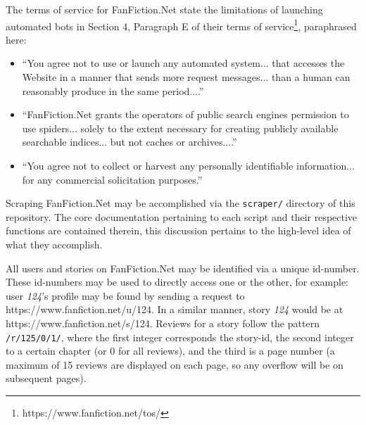 \documentclass[letterpaper]{article}
\begin{document}
The terms of service for FanFiction.Net state the limitations of launching automated bots in Section 4, Paragraph E of their terms of service\footnote{https://www.fanfiction.net/tos/}, paraphrased here:

\begin{itemize}
    \item ``You agree not to use or launch any automated system... that accesses the Website in a manner that sends more request messages... than a human can reasonably produce in the same period....''
    \item ``FanFiction.Net grants the operators of public search engines permission to use spiders... solely to the extent necessary for creating publicly available searchable indices... but not caches or archives....''
    \item ``You agree not to collect or harvest any personally identifiable information... for any commercial solicitation purposes.''
\end{itemize}

Scraping FanFiction.Net may be accomplished via the \texttt{scraper/} directory of this repository. The core documentation pertaining to each script and their respective functions are contained therein, this discussion pertains to the high-level idea of what they accomplish.

All users and stories on FanFiction.Net may be identified via a unique id-number. These id-numbers may be used to directly access one or the other, for example: user \textit{124}'s profile may be found by sending a request to https://www.fanfiction.net/u/124. In a similar manner, story \textit{124} would be at https://www.fanfiction.net/s/124. Reviews for a story follow the pattern \texttt{/r/125/0/1/}, where the first integer corresponds the story-id, the second integer to a certain chapter (or 0 for all reviews), and the third is a page number (a maximum of 15 reviews are displayed on each page, so any overflow will be on subsequent pages).



\end{document}
